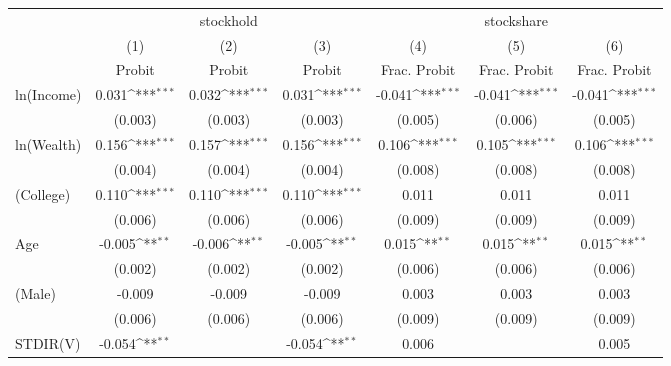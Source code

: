 {
\def\sym#1{\ifmmode^{#1}\else\(^{#1}\)\fi}
\begin{tabular*}{\textwidth}{l@{\extracolsep{\fill}}*{6}{c}}
\toprule
                &\multicolumn{3}{c}{stockhold}                           &\multicolumn{3}{c}{stockshare}                          \\
                &\multicolumn{1}{c}{(1)}&\multicolumn{1}{c}{(2)}&\multicolumn{1}{c}{(3)}&\multicolumn{1}{c}{(4)}&\multicolumn{1}{c}{(5)}&\multicolumn{1}{c}{(6)}\\
                &\multicolumn{1}{c}{Probit}&\multicolumn{1}{c}{Probit}&\multicolumn{1}{c}{Probit}&\multicolumn{1}{c}{Frac. Probit}&\multicolumn{1}{c}{Frac. Probit}&\multicolumn{1}{c}{Frac. Probit}\\
\midrule
ln(Income)      &    0.031\sym{***}&    0.032\sym{***}&    0.031\sym{***}&   -0.041\sym{***}&   -0.041\sym{***}&   -0.041\sym{***}\\
                &  (0.003)         &  (0.003)         &  (0.003)         &  (0.005)         &  (0.006)         &  (0.005)         \\
\addlinespace
ln(Wealth)      &    0.156\sym{***}&    0.157\sym{***}&    0.156\sym{***}&    0.106\sym{***}&    0.105\sym{***}&    0.106\sym{***}\\
                &  (0.004)         &  (0.004)         &  (0.004)         &  (0.008)         &  (0.008)         &  (0.008)         \\
\addlinespace
1(College)      &    0.110\sym{***}&    0.110\sym{***}&    0.110\sym{***}&    0.011         &    0.011         &    0.011         \\
                &  (0.006)         &  (0.006)         &  (0.006)         &  (0.009)         &  (0.009)         &  (0.009)         \\
\addlinespace
Age             &   -0.005\sym{**} &   -0.006\sym{**} &   -0.005\sym{**} &    0.015\sym{**} &    0.015\sym{**} &    0.015\sym{**} \\
                &  (0.002)         &  (0.002)         &  (0.002)         &  (0.006)         &  (0.006)         &  (0.006)         \\
\addlinespace
1(Male)         &   -0.009         &   -0.009         &   -0.009         &    0.003         &    0.003         &    0.003         \\
                &  (0.006)         &  (0.006)         &  (0.006)         &  (0.009)         &  (0.009)         &  (0.009)         \\
\addlinespace
STDIR(V)        &   -0.054\sym{**} &                  &   -0.054\sym{**} &    0.006         &                  &    0.005         \\

\end{tabular*}}
